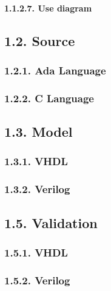\documentclass[
]{article}
\begin{document}
\hypertarget{use-diagram}{%
\paragraph{1.1.2.7. Use diagram}\label{use-diagram}}

\hypertarget{source}{%
\subsection{1.2. Source}\label{source}}

\hypertarget{ada-language}{%
\subsubsection{1.2.1. Ada Language}\label{ada-language}}

\hypertarget{c-language}{%
\subsubsection{1.2.2. C Language}\label{c-language}}

\hypertarget{model}{%
\subsection{1.3. Model}\label{model}}

\hypertarget{vhdl}{%
\subsubsection{1.3.1. VHDL}\label{vhdl}}

\hypertarget{verilog}{%
\subsubsection{1.3.2. Verilog}\label{verilog}}

\hypertarget{validation}{%
\subsection{1.5. Validation}\label{validation}}

\hypertarget{vhdl-1}{%
\subsubsection{1.5.1. VHDL}\label{vhdl-1}}

\hypertarget{verilog-1}{%
\subsubsection{1.5.2. Verilog}\label{verilog-1}}
\end{document}

